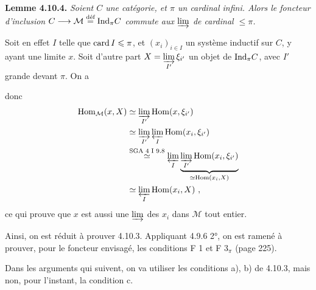 \textbf{Lemme 4.10.4.} \textit{Soient $C$ une catégorie, et $\pi$ un cardinal infini. Alors le foncteur d'inclusion $C \longrightarrow \mathcal{M} \overset{\textup{déf}}{=} \mathrm{Ind}_\pi C$ commute aux $\varinjlim$ de cardinal $\leqslant \pi$.}

Soit en effet $I$ telle que $\operatorname{card} I \leqslant \pi$, et $(x_i)_{i\in I}$ un système inductif sur $C$, y ayant une limite $x$. Soit d'autre part $X = \varinjlim\limits_{I'} \xi_{i'}$ un objet de $\mathrm{Ind}_\pi C$, avec $I'$ grande devant $\pi$. On a

donc
\[
\begin{aligned}
\operatorname{Hom}_{\mathcal{M}}(x,X) &\simeq \varinjlim_{I'} \operatorname{Hom}(x,\xi_{i'})\\
&\simeq \varinjlim_{I'} \varprojlim_{I} \operatorname{Hom}(x_i,\xi_{i'})\\
&\overset{\text{SGA 4 I 9.8}}{\simeq} \varprojlim_{I} \underbrace{\varinjlim_{I'} \operatorname{Hom}(x_i,\xi_{i'})}_{\simeq \operatorname{Hom}(x_i,X)}\\
&\simeq \varprojlim_{I} \operatorname{Hom}(x_i,X)\ ,
\end{aligned}
\]
ce qui prouve que $x$ est aussi une $\varinjlim$ des $x_i$ dans $\mathcal{M}$ tout entier.

Ainsi, on est réduit à prouver 4.10.3. Appliquant 4.9.6 2°, on est ramené à prouver, pour le foncteur envisagé, les conditions F 1 et F $3_\pi$ (page 225).

Dans les arguments qui suivent, on va utiliser les conditions a), b) de 4.10.3, mais non, pour l'instant, la condition c.

